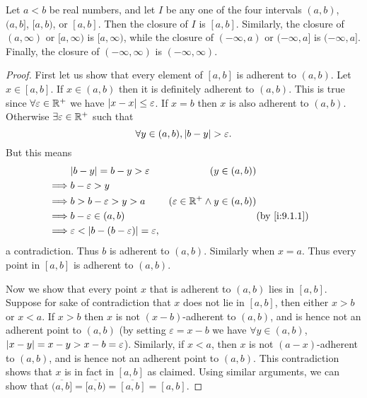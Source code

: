 \begin{lem}\label{i:9.1.12}
  Let \(a < b\) be real numbers, and let \(I\) be any one of the four intervals \((a, b)\), \((a, b]\), \([a, b)\), or \([a, b]\).
  Then the closure of \(I\) is \([a, b]\).
  Similarly, the closure of \((a, \infty)\) or \([a, \infty)\) is \([a, \infty)\), while the closure of \((-\infty, a)\) or \((-\infty, a]\) is \((-\infty, a]\).
  Finally, the closure of \((-\infty, \infty)\) is \((-\infty, \infty)\).
\end{lem}

\begin{proof}
  First let us show that every element of \([a, b]\) is adherent to \((a, b)\).
  Let \(x \in [a, b]\).
  If \(x \in (a, b)\) then it is definitely adherent to \((a, b)\).
  This is true since \(\forall \varepsilon \in \mathbb{R}^+\) we have \(\left\lvert x - x\right\rvert \leq \varepsilon\).
  If \(x = b\) then \(x\) is also adherent to \((a, b)\).
  Otherwise \(\exists \varepsilon \in \mathbb{R}^+\) such that
  \[
    \forall y \in (a, b), \left\lvert b - y\right\rvert > \varepsilon.
  \]
  But this means
  \begin{align*}
             & \abs{b - y} = b - y > \varepsilon                        & (y \in (a, b))                                           \\
    \implies & b - \varepsilon > y                                                                                                 \\
    \implies & b > b - \varepsilon > y > a                              & (\varepsilon \in \R^+ \land y \in (a, b))                \\
    \implies & b - \varepsilon \in (a, b)                               &                                           & \by{i:9.1.1} \\
    \implies & \varepsilon < \abs{b - (b - \varepsilon)} = \varepsilon,
  \end{align*}
  a contradiction.
  Thus \(b\) is adherent to \((a, b)\).
  Similarly when \(x = a\).
  Thus every point in \([a, b]\) is adherent to \((a, b)\).

  Now we show that every point \(x\) that is adherent to \((a, b)\) lies in \([a, b]\).
  Suppose for sake of contradiction that \(x\) does not lie in \([a, b]\), then either \(x > b\) or \(x < a\).
  If \(x > b\) then \(x\) is not \((x - b)\)-adherent to \((a, b)\), and is hence not an adherent point to \((a, b)\)
  (by setting \(\varepsilon = x - b\) we have \(\forall y \in (a, b)\), \(\left\lvert x - y\right\rvert = x - y > x - b = \varepsilon\)).
  Similarly, if \(x < a\), then \(x\) is not \((a - x)\)-adherent to \((a, b)\), and is hence not an adherent point to \((a, b)\).
  This contradiction shows that \(x\) is in fact in \([a, b]\) as claimed.
  Using similar arguments, we can show that \(\overline{(a, b]} = \overline{[a, b)} = \overline{[a, b]} = [a, b]\).


\end{proof}
